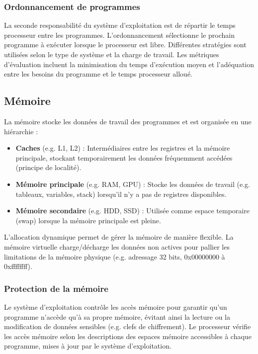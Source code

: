 \subsubsection{Ordonnancement de programmes}

La seconde responsabilité du système d'exploitation est de répartir le temps processeur entre les programmes. 
L'ordonnancement sélectionne le prochain programme à exécuter lorsque le processeur est libre. 
Différentes stratégies sont utilisées selon le type de système et la charge de travail. 
Les métriques d'évaluation incluent la minimisation du temps d'exécution moyen et l'adéquation entre les besoins du programme et le temps processeur alloué.


\subsection{Mémoire}

La mémoire stocke les données de travail des programmes et est organisée en une hiérarchie :
\begin{itemize}
    \item \textbf{Caches} (e.g. L1, L2) : Intermédiaires entre les registres et la mémoire principale, stockant temporairement les données fréquemment accédées (principe de localité).
    \item \textbf{Mémoire principale} (e.g. RAM, GPU) : Stocke les données de travail (e.g. tableaux, variables, stack) lorsqu'il n'y a pas de registres disponibles.
    \item \textbf{Mémoire secondaire} (e.g. HDD, SSD) : Utilisée comme espace temporaire (swap) lorsque la mémoire principale est pleine.
\end{itemize}

L'allocation dynamique permet de gérer la mémoire de manière flexible. La mémoire virtuelle charge/décharge les données non actives pour pallier les limitations de la mémoire physique (e.g. adressage 32 bits, 0x00000000 à 0xffffffff).


\subsubsection{Protection de la mémoire}

Le système d'exploitation contrôle les accès mémoire pour garantir qu'un programme n'accède qu'à sa propre mémoire, évitant ainsi la lecture ou la modification de données sensibles (e.g. clefs de chiffrement). 
Le processeur vérifie les accès mémoire selon les descriptions des espaces mémoire accessibles à chaque programme, mises à jour par le système d'exploitation.

